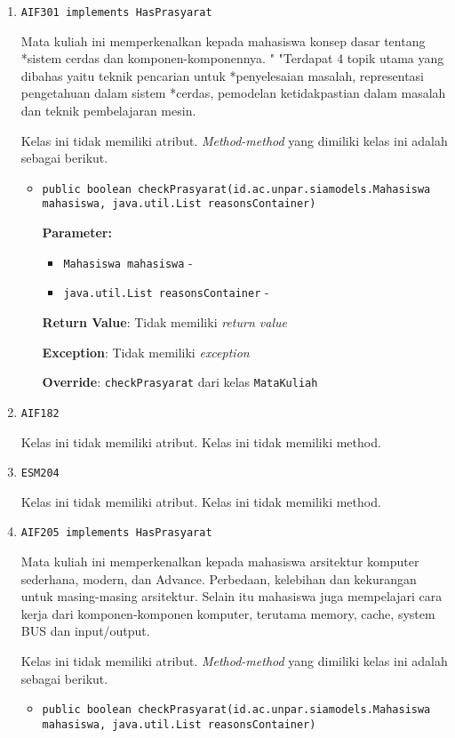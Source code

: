 \documentclass{article}
\begin{document}
\begin{enumerate}
\begin{itemize}
\end{itemize}
\item \texttt{AIF301 implements HasPrasyarat}

Mata kuliah ini memperkenalkan kepada mahasiswa konsep dasar tentang *sistem
 cerdas dan komponen-komponennya. " "Terdapat 4 topik utama yang dibahas yaitu
 teknik pencarian untuk *penyelesaian masalah, representasi pengetahuan dalam
 sistem *cerdas, pemodelan ketidakpastian dalam masalah dan teknik
 pembelajaran mesin.

Kelas ini tidak memiliki atribut. \textit{Method-method} yang dimiliki kelas ini adalah sebagai berikut.
\begin{itemize}
\item \texttt{public boolean checkPrasyarat(id.ac.unpar.siamodels.Mahasiswa mahasiswa, java.util.List reasonsContainer)}

\textbf{Parameter:}
\begin{itemize}
\item \texttt{Mahasiswa mahasiswa} - 
\item \texttt{java.util.List reasonsContainer} - 
\end{itemize}
\textbf{Return Value}: Tidak memiliki \textit{return value}

\textbf{Exception}: Tidak memiliki \textit{exception}

\textbf{Override}: \texttt{checkPrasyarat} dari kelas \texttt{MataKuliah}

\end{itemize}
\item \texttt{AIF182}



Kelas ini tidak memiliki atribut. Kelas ini tidak memiliki method. \item \texttt{ESM204}



Kelas ini tidak memiliki atribut. Kelas ini tidak memiliki method. \item \texttt{AIF205 implements HasPrasyarat}

Mata kuliah ini memperkenalkan kepada mahasiswa arsitektur komputer 
 sederhana, modern, dan Advance. Perbedaan, kelebihan dan kekurangan untuk 
 masing-masing arsitektur. Selain itu mahasiswa juga mempelajari cara kerja 
 dari komponen-komponen komputer, terutama memory, cache, system BUS dan 
 input/output.

Kelas ini tidak memiliki atribut. \textit{Method-method} yang dimiliki kelas ini adalah sebagai berikut.
\begin{itemize}
\item \texttt{public boolean checkPrasyarat(id.ac.unpar.siamodels.Mahasiswa mahasiswa, java.util.List reasonsContainer)}


\end{itemize}
\end{enumerate}
\end{document}
